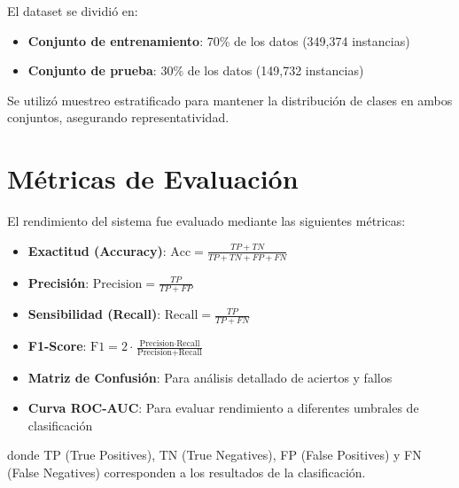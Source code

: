 El dataset se dividió en:

\begin{itemize}
    \item \textbf{Conjunto de entrenamiento}: 70\% de los datos (349,374 instancias)
    \item \textbf{Conjunto de prueba}: 30\% de los datos (149,732 instancias)
\end{itemize}

Se utilizó muestreo estratificado para mantener la distribución de clases en ambos conjuntos, asegurando representatividad.

\section{Métricas de Evaluación}\label{sec:metricas}

El rendimiento del sistema fue evaluado mediante las siguientes métricas:

\begin{itemize}
    \item \textbf{Exactitud (Accuracy)}: $\text{Acc} = \frac{TP + TN}{TP + TN + FP + FN}$
    \item \textbf{Precisión}: $\text{Precision} = \frac{TP}{TP + FP}$
    \item \textbf{Sensibilidad (Recall)}: $\text{Recall} = \frac{TP}{TP + FN}$
    \item \textbf{F1-Score}: $\text{F1} = 2 \cdot \frac{\text{Precision} \cdot \text{Recall}}{\text{Precision} + \text{Recall}}$
    \item \textbf{Matriz de Confusión}: Para análisis detallado de aciertos y fallos
    \item \textbf{Curva ROC-AUC}: Para evaluar rendimiento a diferentes umbrales de clasificación
\end{itemize}

donde TP (True Positives), TN (True Negatives), FP (False Positives) y FN (False Negatives) corresponden a los resultados de la clasificación.